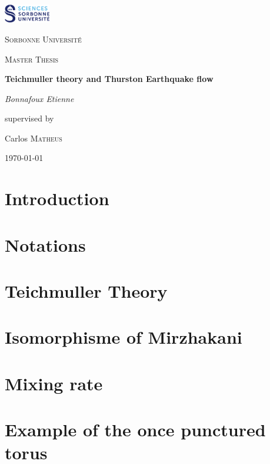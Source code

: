 \documentclass[12pt]{article}
\theoremstyle{plain}%
\theoremstyle{definition}
\theoremstyle{remark}
\begin{document}

\begin{titlepage}
	\centering
	\includegraphics[width=0.15\textwidth]{Image/Sorbonne.png}\par\vspace{1cm}
	{\scshape\LARGE Sorbonne Université \par}
	\vspace{1cm}
	{\scshape\Large Master Thesis\par}
	\vspace{1.5cm}
	{\huge\bfseries Teichmuller theory and Thurston Earthquake flow\par}
	\vspace{2cm}
	{\Large\itshape Bonnafoux Etienne\par}
	\vfill
	supervised by\par
	Carlos \textsc{Matheus}

	\vfill

	{\large \today\par}
\end{titlepage}

\newpage


\newpage

\tableofcontents
\newpage

\section{Introduction}

\newpage

\section{Notations}
\printnomenclature

\newpage

\section{Teichmuller Theory}

\newpage

\section{Isomorphisme of Mirzhakani}

\newpage

\section{Mixing rate}

\newpage

\section{Example of the once punctured torus}

\newpage



\end{document}
